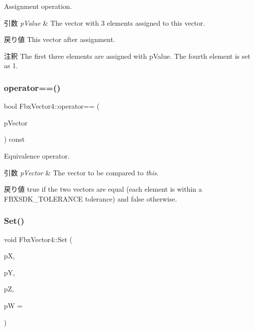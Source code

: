Assignment operation. 
\begin{DoxyParams}{引数}
{\em p\+Value} & The vector with 3 elements assigned to this vector. \\
\hline
\end{DoxyParams}
\begin{DoxyReturn}{戻り値}
This vector after assignment. 
\end{DoxyReturn}
\begin{DoxyRemark}{注釈}
The first three elements are assigned with p\+Value. The fourth element is set as 1. 
\end{DoxyRemark}
\mbox{\label{class_fbx_vector4_a25462c5cdd200b19ad30e0ab4a7eac44}} 
\subsubsection{\texorpdfstring{operator==()}{operator==()}}
{\footnotesize\ttfamily bool Fbx\+Vector4\+::operator== (\begin{DoxyParamCaption}\item[{const \hyperlink{class_fbx_vector4}{Fbx\+Vector4} \&}]{p\+Vector }\end{DoxyParamCaption}) const}

Equivalence operator. 
\begin{DoxyParams}{引数}
{\em p\+Vector} & The vector to be compared to {\itshape this}. \\
\hline
\end{DoxyParams}
\begin{DoxyReturn}{戻り値}
{\ttfamily true} if the two vectors are equal (each element is within a F\+B\+X\+S\+D\+K\+\_\+\+T\+O\+L\+E\+R\+A\+N\+CE tolerance) and {\ttfamily false} otherwise. 
\end{DoxyReturn}
\mbox{\label{class_fbx_vector4_a795ea8407ea23691a90e0fbb349170c5}} 
\subsubsection{\texorpdfstring{Set()}{Set()}}
{\footnotesize\ttfamily void Fbx\+Vector4\+::\+Set (\begin{DoxyParamCaption}\item[{double}]{pX,  }\item[{double}]{pY,  }\item[{double}]{pZ,  }\item[{double}]{pW = {} }\end{DoxyParamCaption})}

